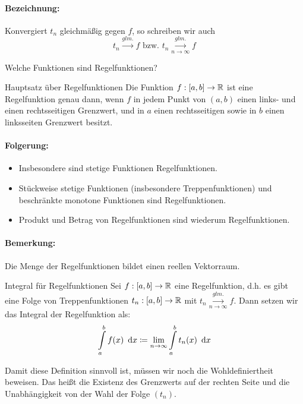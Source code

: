 \paragraph{Bezeichnung:}
Konvergiert $t_n$ gleichmäßig gegen $f$, so schreiben wir auch
\begin{equation*}
	t_n\overset{glm.}\longrightarrow f \text{ bzw. } t_n\overset{glm.}{\underset{n\to\infty}\longrightarrow} f
\end{equation*}


Welche Funktionen sind Regelfunktionen?
\begin{satz}{Hauptsatz über Regelfunktionen}
	Die Funktion $f:[a,b]\rightarrow\mathbb{R}$ ist eine Regelfunktion genau dann, wenn $f$ in jedem Punkt von $(a,b)$ einen links- und einen rechtsseitigen Grenzwert, und in $a$ einen rechtsseitigen sowie in $b$ einen linksseiten Grenzwert besitzt.
\end{satz}
\paragraph{Folgerung:}
\begin{itemize}
	\item Insbesondere sind stetige Funktionen Regelfunktionen.
	\item Stückweise stetige Funktionen (insbesondere Treppenfunktionen) und beschränkte monotone Funktionen sind Regelfunktionen.
	\item Produkt und Betrag von Regelfunktionen sind wiederum Regelfunktionen.
\end{itemize}
\paragraph{Bemerkung:}
Die Menge der Regelfunktionen bildet einen reellen Vektorraum.

\begin{definition}{Integral für Regelfunktionen}
	Sei $f:[a,b]\rightarrow\mathbb{R}$ eine Regelfunktion, d.h. es gibt eine Folge von Treppenfunktionen $t_n:[a,b]\rightarrow\mathbb{R}$ mit $t_n\overset{glm.}{\underset{n\to\infty}\longrightarrow} f$.
	Dann setzen wir das Integral der Regelfunktion als:
	\begin{equation*}
		\int\limits_a^b f(x)\ \operatorname{d}\! x\coloneqq \lim\limits_{n\to\infty}\int\limits_a^b t_n(x)\ \operatorname{d}\! x
	\end{equation*}
\end{definition}

Damit diese Definition sinnvoll ist, müssen wir noch die Wohldefiniertheit beweisen. Das heißt die Existenz des Grenzwerts auf der rechten Seite und die Unabhängigkeit von der Wahl der Folge $(t_n)$.

